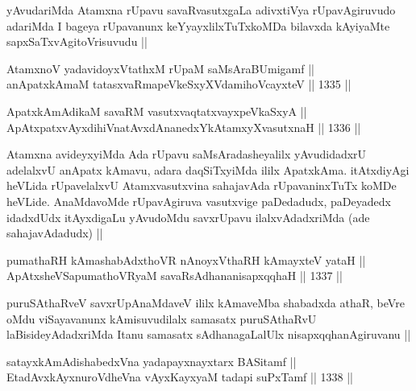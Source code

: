 \begin{artha}
yAvudariMda Atamxna rUpavu savaRvasutxgaLa adivxtiVya rUpavAgiruvudo adariMda I bageya rUpavanunx keYyayxlilxTuTxkoMDa bilavxda kAyiyaMte sapxSaTxvAgitoVrisuvudu ||
\end{artha}


\begin{shl}
AtamxnoV yadavidoyxVtathxM rUpaM saMsAraBUmigamf || \\
anApatxkAmaM tatasxvaRmapeVkeSxyXVdamihoVcayxteV ||  1335 ||  
\end{shl}
				
\begin{shl}
ApatxkAmAdikaM savaRM vasutxvaqtatxvayxpeVkaSxyA || \\
ApAtxpatxvAyxdihiVnatAvxdAnanedxYkAtamxyXvasutxnaH ||  1336 ||  
\end{shl}

\begin{artha}
Atamxna avideyxyiMda Ada rUpavu saMsAradasheyalilx yAvudidadxrU adelalxvU anApatx kAmavu, adara daqSiTxyiMda ililx ApatxkAma. itAtxdiyAgi heVLida rUpavelalxvU Atamxvasutxvina sahajavAda rUpavaninxTuTx koMDe heVLide. AnaMdavoMde rUpavAgiruva vasutxvige paDedadudx, paDeyadedx idadxdUdx itAyxdigaLu yAvudoMdu savxrUpavu ilalxvAdadxriMda (ade sahajavAdadudx) ||
\end{artha}


\begin{shl}
pumathaRH kAmashabAdxthoVR nAnoyxV\s thaRH kAmayxteV yataH || \\
ApAtxsheVSapumathoVR\s yaM savaRsAdhananisapxqqhaH ||  1337 ||  
\end{shl}

\begin{artha}
puruSAthaRveV savxrUpAnaMdaveV ililx kAmaveMba shabadxda athaR, beVre oMdu viSayavanunx kAmisuvudilalx samasatx puruSAthaRvU laBisideyAdadxriMda Itanu samasatx sAdhanagaLalUlx nisapxqqhanAgiruvanu ||
\end{artha}


\begin{shl}
satayxkAmAdishabedxVna yadapayxnayxtarx BASitamf || \\
EtadAvxkAyxnuroVdheVna vAyxKayxyaM tadapi suPxTamf ||  1338 ||  
\end{shl}

